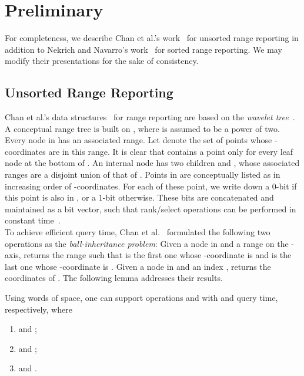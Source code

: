 \documentclass{llncs}
\begin{document}
\section{Preliminary}
\label{section_preliminary}

For completeness, we describe Chan et al.'s work~\cite{DBLP:conf/compgeom/ChanLP11} for unsorted range reporting
in addition to Nekrich and Navarro's work~\cite{DBLP:conf/swat/NekrichN12} for sorted range reporting.
We may modify their presentations for the sake of consistency.

\subsection{Unsorted Range Reporting}
\label{subsection_unsorted}

Chan et al.'s data structures~\cite{DBLP:conf/compgeom/ChanLP11} for range reporting
are based on the \emph{wavelet tree}~\cite{DBLP:journals/siamcomp/Chazelle88,DBLP:conf/soda/GrossiGV03}.
A conceptual range tree  is built on , where  is assumed to be a power of two.
Every node  in  has an associated range.
Let  denote the set of points whose -coordinates are in this range.
It is clear that  contains a point only for every leaf node  at the bottom of .
An internal node  has two children  and , whose associated ranges are a disjoint union of that of .
Points in  are conceptually listed as  in increasing order of -coordinates.
For each of these point, we write down a 0-bit if this point is also in , or a 1-bit otherwise.
These bits are concatenated and maintained as a bit vector,
such that rank/select operations can be performed in constant time~\cite{DBLP:conf/soda/ClarkM96}. \\
\indent To achieve efficient query time,
Chan et al.~\cite{DBLP:conf/compgeom/ChanLP11} formulated the following two operations as the \emph{ball-inheritance problem}:
Given a node  in  and a range  on the -axis,
 returns the range  such that
 is the first one whose -coordinate is 
and  is the last one whose -coordinate is .
Given a node  in  and an index ,
 returns the coordinates of .
The following lemma addresses their results.
\begin{lemma}
    \label{lemma_ball_inheritance}
    Using  words of space,
    one can support operations  and  with  and  query time, respectively,
    where
    \begin{enumerate}
        \item  and ;
        \item  and ;
        \item  and .
    \end{enumerate}
\end{lemma}
\end{document}

